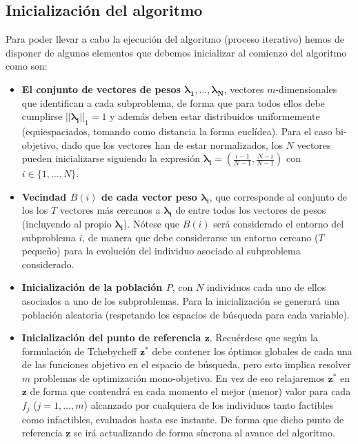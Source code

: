 \subsection{Inicialización del algoritmo}

Para poder llevar a cabo la ejecución del algoritmo (proceso iterativo) hemos de disponer de algunos elementos que debemos inicializar al comienzo del algoritmo como son: \\

\begin{itemize}
    \item \textbf{El conjunto de vectores de pesos $\boldsymbol{\lambda_1}, \dots, \boldsymbol{\lambda_N}$}, vectores $m$-dimensionales que identifican a cada subproblema, de forma que para todos ellos debe cumplirse $||\boldsymbol{\lambda_{i}}||_{1} = 1$ y además deben estar distribuidos uniformemente (equiespaciados, tomando como distancia la forma euclídea). Para el caso bi-objetivo, dado que los vectores han de estar normalizados, los $N$ vectores pueden inicializarse siguiendo la expresión $\boldsymbol{\lambda_i} = \left(\frac{i-1}{N-1}, \frac{N-i}{N-1} \right)$ con $i \in \{1, \dots, N\}$.\\
    
    \item \textbf{Vecindad $B(i)$ de cada vector peso $\boldsymbol{\lambda_i}$}, que corresponde al conjunto de los  los $T$ vectores más cercanos a $\boldsymbol{\lambda_i}$ de entre todos los vectores de pesos (incluyendo al propio $\boldsymbol{\lambda_i}$). Nótese que $B(i)$ será considerado el entorno del subproblema $i$, de manera que debe considerarse un entorno cercano ($T$ pequeño) para la evolución del individuo asociado al subproblema considerado.\\

    
    \item \textbf{Inicialización de la población $P$}, con $N$ individuos cada uno de ellos asociados a uno de los subproblemas. Para la inicialización se generará una población aleatoria (respetando los espacios de búsqueda para cada variable). \\

    \item \textbf{Inicialización del punto de referencia $\boldsymbol{z}$}. Recuérdese que según la formulación de Tchebycheff $\boldsymbol{z}^{*}$ debe contener los óptimos globales de cada una de las funciones objetivo en el espacio de búsqueda, pero esto implica resolver $m$ problemas de optimización mono-objetivo. En vez de eso relajaremos $\boldsymbol{z^{*}}$ en $\boldsymbol{z}$ de forma que contendrá en cada momento el mejor (menor) valor para cada $f_j$ ($j = 1, \dots, m$) alcanzado por cualquiera de los individuos tanto factibles como infactibles, evaluados hasta ese instante. De forma que dicho punto de referencia $\boldsymbol{z}$ se irá actualizando de forma síncrona al avance del algoritmo.\\
    

\end{itemize}
